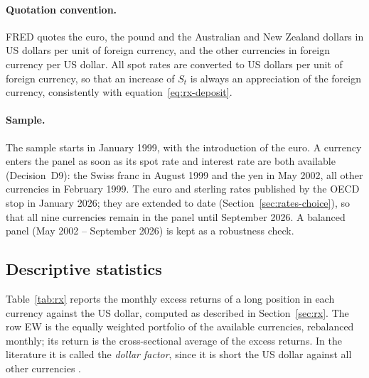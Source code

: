 \paragraph{Quotation convention.}
FRED quotes the euro, the pound and the Australian and New Zealand dollars in US dollars per unit of foreign currency, and the other currencies in foreign currency per US dollar.
All spot rates are converted to US dollars per unit of foreign currency, so that an increase of $S_t$ is always an appreciation of the foreign currency, consistently with equation~\eqref{eq:rx-deposit}.

\paragraph{Sample.}
The sample starts in January 1999, with the introduction of the euro.
A currency enters the panel as soon as its spot rate and interest rate are both available (Decision~D9): the Swiss franc in August 1999 and the yen in May 2002, all other currencies in February 1999.
The euro and sterling rates published by the OECD stop in January 2026; they are extended to date (Section~\ref{sec:rates-choice}), so that all nine currencies remain in the panel until September 2026.
A balanced panel (May 2002 -- September 2026) is kept as a robustness check.

\subsection{Descriptive statistics}

Table~\ref{tab:rx} reports the monthly excess returns of a long position in each currency against the US dollar, computed as described in Section~\ref{sec:rx}.
The row EW is the equally weighted portfolio of the available currencies, rebalanced monthly; its return is the cross-sectional average of the excess returns.
In the literature it is called the \emph{dollar factor}, since it is short the US dollar against all other currencies \citep{lustig2011}.

\begin{table}[h]
\centering
\scriptsize

\caption{Monthly currency excess returns against the US dollar, February 1999 -- September 2026. Mean, carry and volatility are annualised ($\times 12$ and $\times\sqrt{12}$). Carry is the average forward discount $S_t/F_t - 1$, the excess return earned if the spot rate does not move. Sharpe is the annualised mean divided by the annualised volatility (the returns are already in excess of the US rate). Max DD is the maximum drawdown. Generated by \texttt{scripts/describe\_returns.py}.}
\label{tab:rx}
\end{table}

